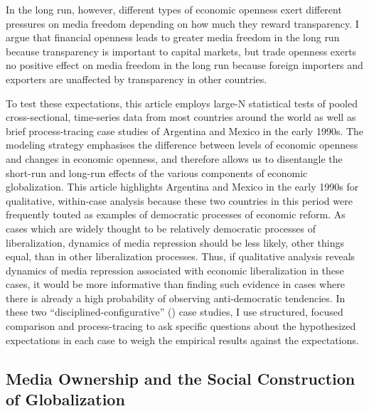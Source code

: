 \documentclass[12pt]{report}
\begin{document}
In the long run, however, different types of economic openness exert different
pressures on media freedom depending on how much they reward transparency. I argue that financial
openness leads to greater media freedom in the long run because transparency is important to capital
markets, but trade openness exerts no positive effect on media freedom in the long run because
foreign importers and exporters are unaffected by transparency in other countries.

To test these expectations, this article employs large-N statistical tests of pooled cross-sectional, time-series data from most countries around the world as well as brief process-tracing case studies of Argentina and Mexico in the early 1990s. The modeling strategy emphasises the difference between levels of economic openness and changes in economic openness, and therefore allows us to disentangle the short-run and long-run effects of the various components of economic globalization. This article highlights Argentina and Mexico in the early 1990s for qualitative, within-case analysis because these two countries in this period were frequently touted as examples of democratic processes of economic reform. As cases which are widely thought to be relatively democratic processes of liberalization, dynamics of media repression should be less likely, other things equal, than in other liberalization processes. Thus, if qualitative analysis reveals dynamics of media repression associated with economic liberalization in these cases, it would be more informative than finding such evidence in cases where there is already a high probability of observing anti-democratic tendencies. In these two ``disciplined-configurative'' (\citealt[75]{george2005case}) case studies, I use structured, focused comparison and process-tracing to ask specific questions about the hypothesized expectations in each case to weigh the empirical results against the expectations.

\subsection{Media Ownership and the Social Construction of Globalization}
\end{document}
